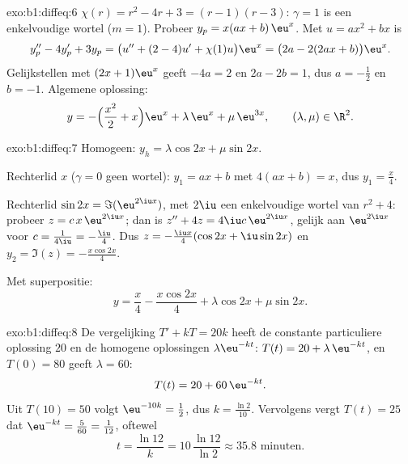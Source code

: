 \begin{solution}{exo:b1:diffeq:6}
$\chi(r) = r^2 - 4r + 3 = (r-1)(r-3)$: $\gamma = 1$ is een enkelvoudige
wortel ($m = 1$). Probeer $y_p = x(ax + b)\,\eu^x$. Met $u = ax^2 + bx$
is
\[
y_p'' - 4y_p' + 3y_p = \bigl(u'' + (2 - 4)u' + \chi(1) u\bigr)\eu^x
= \bigl(2a - 2(2ax + b)\bigr)\eu^x .
\]
Gelijkstellen met $(2x + 1)\eu^x$ geeft $-4a = 2$ en $2a - 2b = 1$, dus
$a = -\frac12$ en $b = -1$. Algemene oplossing:
\[
y = -\Bigl(\frac{x^2}{2} + x\Bigr)\eu^{x} + \lambda\,\eu^{x} +
\mu\,\eu^{3x}, \qquad (\lambda, \mu) \in \R^2 .
\]
\end{solution}

\begin{solution}{exo:b1:diffeq:7}
Homogeen: $y_h = \lambda\cos 2x + \mu\sin 2x$.

Rechterlid $x$ ($\gamma = 0$ geen wortel): $y_1 = ax + b$ met $4(ax + b)
= x$, dus $y_1 = \frac x4$.

Rechterlid $\sin 2x = \Im(\eu^{2\iu x})$, met $2\iu$ een enkelvoudige
wortel van $r^2 + 4$: probeer $z = c\,x\,\eu^{2\iu x}$; dan is $z'' + 4z
= 4\iu c\,\eu^{2\iu x}$, gelijk aan $\eu^{2\iu x}$ voor $c =
\frac{1}{4\iu} = -\frac{\iu}{4}$. Dus $z = -\frac{\iu x}{4}(\cos 2x + \iu
\sin 2x)$ en $y_2 = \Im(z) = -\frac{x\cos 2x}{4}$.

Met superpositie:
\[
y = \frac{x}{4} - \frac{x\cos 2x}{4} + \lambda\cos 2x + \mu\sin 2x .
\]
\end{solution}

\begin{solution}{exo:b1:diffeq:8}
De vergelijking $T' + kT = 20k$ heeft de constante particuliere
oplossing $20$ en de homogene oplossingen $\lambda\eu^{-kt}$: $T(t) = 20
+ \lambda\,\eu^{-kt}$, en $T(0) = 80$ geeft $\lambda = 60$:
\[
T(t) = 20 + 60\,\eu^{-kt} .
\]
Uit $T(10) = 50$ volgt $\eu^{-10k} = \frac12$, dus $k = \frac{\ln
2}{10}$. Vervolgens vergt $T(t) = 25$ dat $\eu^{-kt} = \frac{5}{60} =
\frac{1}{12}$, oftewel
\[
t = \frac{\ln 12}{k} = 10\,\frac{\ln 12}{\ln 2} \approx 35.8
\text{ minuten.}
\]
\end{solution}

